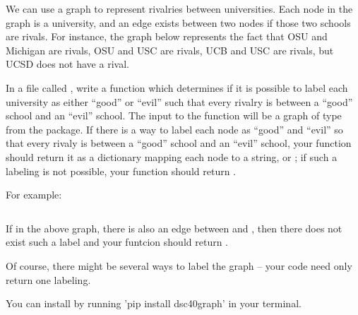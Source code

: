 \begin{progprob}
    We can use a graph to represent rivalries between universities. Each
    node in the graph is a university, and an edge exists between two nodes
    if those two schools are rivals. For instance, the graph below represents
    the fact that OSU and Michigan are rivals, OSU and USC are rivals, UCB
    and USC are rivals, but UCSD does not have a rival.

    \begin{center}
    \end{center}

    In a file called , write a function
     which determines if it is possible
    to label each university as either ``good'' or ``evil'' such that every
    rivalry is between a ``good'' school
    and an ``evil'' school. 
    The input to the function will be a graph of type 
    from the  package. If there is a way to label each node
    as ``good'' and ``evil'' so that every rivaly is between a ``good'' school
    and an ``evil'' school, your function should return it as a dictionary
    mapping each node to a string,  or ; if such
    a labeling is not possible, your function should return . 

    For example:
    \inputminted{python}{\thisdir/include/example.py}

    If in the above graph, there is also an edge between  and , then there does not exist such a label and your funtcion should return .

    Of course, there might be several ways to label the graph -- your code need only
    return one labeling.

    You can install  by running 'pip install dsc40graph' in your terminal.


\end{progprob}
